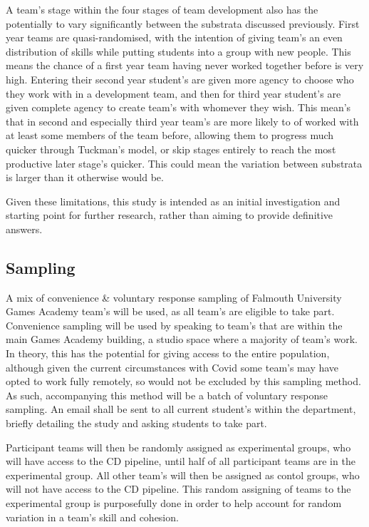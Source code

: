 \documentclass[lettersize,journal]{IEEEtran}
\begin{document}
        A team's stage within the four stages of team development\cite{tuckman1965developmental} also has the potentially to vary significantly between the substrata discussed previously. First year teams are quasi-randomised, with the intention of giving team's an even distribution of skills while putting students into a group with new people. This means the chance of a first year team having never worked together before is very high. Entering their second year student's are given more agency to choose who they work with in a development team, and then for third year student's are given complete agency to create team's with whomever they wish. This mean's that in second and especially third year team's are more likely to of worked with at least some members of the team before, allowing them to progress much quicker through Tuckman's model, or skip stages entirely to reach the most productive later stage's quicker. This could mean the variation between substrata is larger than it otherwise would be.

        Given these limitations, this study is intended as an initial investigation and starting point for further research, rather than aiming to provide definitive answers.

    \subsection{Sampling}
        A mix of convenience \& voluntary response sampling of Falmouth University Games Academy team's will be used, as all team's are eligible to take part. Convenience sampling will be used by speaking to team's that are within the main Games Academy building, a studio space where a majority of team's work. In theory, this has the potential for giving access to the entire population, although given the current circumstances with Covid\cite{bbcomicron} some team's may have opted to work fully remotely, so would not be excluded by this sampling method.\\
        As such, accompanying this method will be a batch of voluntary response sampling. An email shall be sent to all current student's within the department, briefly detailing the study and asking students to take part.

        Participant teams will then be randomly assigned as experimental groups, who will have access to the CD pipeline, until half of all participant teams are in the experimental group. All other team's will then be assigned as contol groups, who will not have access to the CD pipeline. This random assigning of teams to the experimental group is purposefully done in order to help account for random variation in a team's skill and cohesion.
        
\end{document}
